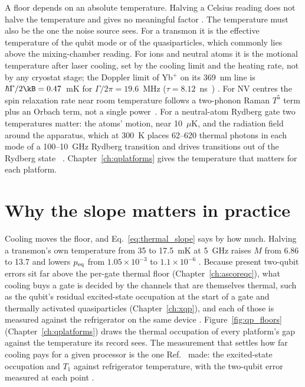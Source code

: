 \begin{remark}
A floor depends on an absolute temperature. Halving a Celsius reading does not halve the temperature and gives no meaningful factor \calc. The
temperature must also be the one the noise source sees. For a transmon it is the effective temperature of the qubit
mode or of the quasiparticles, which commonly lies above the mixing-chamber reading. For ions and neutral atoms it is
the motional temperature after laser cooling, set by the cooling limit and the heating rate, not by any cryostat
stage; the Doppler limit of Yb$^+$ on its 369~nm line is $\hbar\Gamma/2\kB=0.47$~mK for $\Gamma/2\pi=19.6$~MHz ($\tau=8.12$~ns~\cite{Olmschenk2009})
\calc. For NV centres the spin relaxation rate near room temperature follows a two-phonon Raman $T^5$ term plus an
Orbach term, not a single power~\cite{Jarmola2012}.
For a neutral-atom Rydberg gate two temperatures matter: the atoms' motion, near 10~$\mu$K, and the radiation field around the apparatus, which at
300~K places 62--620 thermal photons in each mode of a 100--10~GHz Rydberg transition and drives transitions out of the Rydberg state
\calc~\cite{Beterov2009}. Chapter~\ref{ch:qplatforms} gives the temperature that matters for each platform.
\end{remark}

\section{Why the slope matters in practice}
Cooling moves the floor, and Eq.~\eqref{eq:thermal_slope} says by how much. Halving a transmon's own temperature from 35 to 17.5~mK at 5~GHz
raises $M$ from 6.86 to 13.7 and lowers $p_{\rm eq}$ from $1.05\times10^{-3}$ to $1.1\times10^{-6}$ \calc. Because present two-qubit errors sit
far above the per-gate thermal floor (Chapter~\ref{ch:ascoreqc}), what cooling buys a gate is decided by the channels that are themselves
thermal, such as the qubit's residual excited-state occupation at the start of a gate and thermally activated quasiparticles (Chapter~\ref{ch:xqp}),
and each of those is measured against the refrigerator on the same device \interp. Figure~\ref{fig:qp_floors} (Chapter~\ref{ch:qplatforms})
draws the thermal occupation of every platform's gap against the temperature its record sees. The measurement that settles how far cooling
pays for a given processor is the one Ref.~\cite{Jin2015} made: the excited-state occupation and $T_1$ against refrigerator temperature, with
the two-qubit error measured at each point \openprob.
